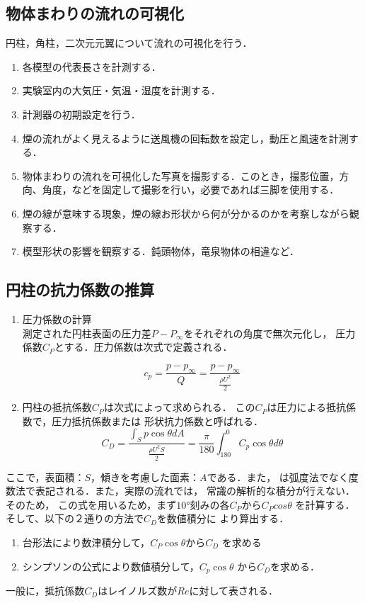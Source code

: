 \documentclass[a4paper,titlepage]{ltjsarticle}
\begin{document}
\subsection{物体まわりの流れの可視化}
円柱，角柱，二次元元翼について流れの可視化を行う．
\begin{enumerate}
  \item 各模型の代表長さを計測する．
  \item 実験室内の大気圧・気温・湿度を計測する．
  \item 計測器の初期設定を行う．
  \item 煙の流れがよく見えるように送風機の回転数を設定し，動圧と風速を計測する．
  \item 物体まわりの流れを可視化した写真を撮影する．このとき，撮影位置，方向、角度，などを固定して撮影を行い，必要であれば三脚を使用する．
  \item 煙の線が意味する現象，煙の線お形状から何が分かるのかを考察しながら観察する．
  \item 模型形状の影響を観察する．鈍頭物体，竜泉物体の相違など．
\end{enumerate}

\subsection{円柱の抗力係数の推算}
\begin{enumerate}
  \item 圧力係数の計算\\
  測定された円柱表面の圧力差$P-P_{\infty}$をそれぞれの角度で無次元化し，
  圧力係数$C_{P}$とする．圧力係数は次式で定義される．

  \begin{equation}
c_p=\frac{p-p_\infty}{Q}=\frac{p-p_\infty}{\frac{\rho U^2}{2}}    
  \end{equation}

  \item 円柱の抵抗係数$C_P$は次式によって求められる．
  この$C_P$は圧力による抵抗係数で，圧力抵抗係数または
  形状抗力係数と呼ばれる．
  \begin{equation}
      C_D=\frac{\int _Sp\cos \theta dA}{\frac{\rho U^2S}{2}}=\frac{\pi}{180}\int_{180}^{0} C_p \cos \theta d\theta 
      \label{cd}
  \end{equation}

\end{enumerate}

 ここで，表面積：$S$，傾きを考慮した面素：$A$である．また，
\theta は弧度法でなく度数法で表記される．また，実際の流れでは，
常識の解析的な積分が行えない．そのため，
この式を用いるため，まず$\ang{10}$刻みの各$C_P$から$C_P cos\theta$
を計算する．そして、以下の２通りの方法で$C_D$を数値積分に
より算出する．
\begin{enumerate}
  \item 台形法により数津積分して，$C_P \cos\theta$から$C_D$
  を求める
  \item シンプソンの公式により数値積分して，$C_p \cos\theta$
  から$C_D$を求める．
\end{enumerate}
一般に，抵抗係数$C_D$はレイノルズ数が$Re$に対して表される．
\\
\\
\end{document}
